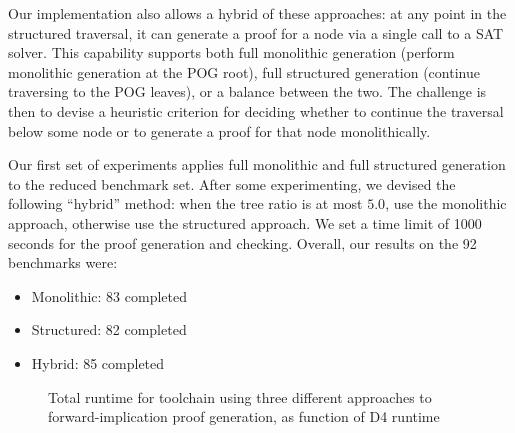 \documentclass[twoside,11pt]{article}
\begin{document}
Our implementation also allows a hybrid of these approaches: at any
point in the structured traversal, it can generate a proof for a node via a
single call to a SAT solver.  This capability supports both full
monolithic generation (perform monolithic generation at the POG root),
full structured generation (continue traversing to the POG leaves), or
a balance between the two.
The challenge is then to devise a
heuristic criterion for deciding whether to continue the traversal below
some node or to generate a proof for that node monolithically.

Our first set of experiments applies full monolithic and full structured generation to the reduced benchmark set.  
After some experimenting, we devised the following ``hybrid'' method: when the tree ratio is at most $5.0$, use the monolithic approach, otherwise use the structured approach.
We set a time limit of 1000 seconds for the proof generation and checking.
Overall, our results on the 92 benchmarks were:
\begin{itemize}
\item Monolithic: 83 completed
\item Structured: 82 completed
\item Hybrid: 85 completed
\end{itemize}


\begin{figure}
\caption{Total runtime for toolchain using three different approaches to forward-implication proof generation, as function of D4 runtime}
\label{fig:d4:cpog:compare}
\end{figure}
\end{document}
